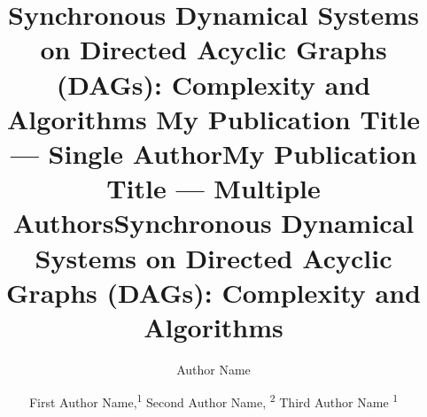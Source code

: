 \documentclass[letterpaper]{article} %
\title{Synchronous Dynamical Systems on Directed Acyclic Graphs (DAGs):
       Complexity and Algorithms
}
\author{
\iffalse
    Written by AAAI Press Staff\textsuperscript{\rm 1}\thanks{With help from the AAAI Publications Committee.}\\
    AAAI Style Contributions by Pater Patel Schneider,
    Sunil Issar,  \\
    J. Scott Penberthy,
    George Ferguson,
    Hans Guesgen,
    Francisco Cruz,
    Marc Pujol-Gonzalez
    \\
\fi
}
\title{My Publication Title --- Single Author}
\author {
    Author Name \\
}
\title{My Publication Title --- Multiple Authors}
\author {

        First Author Name,\textsuperscript{\rm 1}
        Second Author Name, \textsuperscript{\rm 2}
        Third Author Name \textsuperscript{\rm 1} \\
}
\title{Synchronous Dynamical Systems on Directed Acyclic Graphs (DAGs):\newline
       Complexity and Algorithms}
\author{}
\begin{document}
\linenumbers  %

\newtheorem{theorem}{Theorem}[section]
\newtheorem{lemma}{Lemma}[section]
\newtheorem{corollary}{Corollary}[section]
\newtheorem{fact}{Fact}[section]
\newtheorem{definition}{Definition}[section]
\newtheorem{proposition}{Proposition}[section]
\newtheorem{observation}{Observation}[section]
\newtheorem{claim}{Claim}[section]

\newcommand{\true}{\texttt{True}}
\newcommand{\false}{\texttt{False}}

\newcommand{\QED}{\hfill\rule{2mm}{2mm}}

\newcommand{\irange}{\mbox{$1 \leq i \leq n$}}
\newcommand{\jrange}{\mbox{$1 \leq j \leq m$}}

\newcommand{\dunder}[1]{\underline{\underline{#1}}}

\newcommand{\bbb}{\mbox{$\mathbb{B}$}}

\newcommand{\cals}{\mbox{$\mathcal{S}$}}
\newcommand{\calc}{\mbox{$\mathcal{C}$}}
\newcommand{\cali}{\mbox{$\mathcal{I}$}}
\newcommand{\calcp}{\mbox{$\mathcal{C'}$}}
\newcommand{\cald}{\mbox{$\mathcal{D}$}}
\newcommand{\call}{\mbox{$\mathcal{L}$}}
\newcommand{\calf}{\mbox{$\mathcal{F}$}}

\newcommand{\calco}{\mbox{$\mathcal{C}_{1}$}}
\newcommand{\calcz}{\mbox{$\mathcal{C}_0$}}
\newcommand{\calci}{\mbox{$\mathcal{C}_i$}}
\newcommand{\calcipo}{\mbox{$\mathcal{C}_{i+1}$}}
\newcommand{\calct}{\mbox{$\mathcal{C}_{t}$}}
\newcommand{\calctmo}{\mbox{$\mathcal{C}_{t-1}$}}
\newcommand{\dcare}{\texttt{x}}

\newcommand{\genprob}{\mbox{\textsc{CSC}}}
\newcommand{\pre}{\textsc{Pre}}
\newcommand{\npre}{\textsc{\#Pre}}

\newcommand{\cnp}{\textbf{NP}}
\newcommand{\cconp}{\textbf{Co-NP}}
\newcommand{\cpsp}{\textbf{PSPACE}}

\maketitle

\begin{abstract}

\end{abstract}









\end{document}
